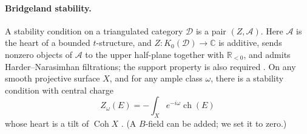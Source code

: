 \documentclass[11pt]{article}
\theoremstyle{definition}
\theoremstyle{remark}
\begin{document}
\paragraph{Bridgeland stability.} A stability condition on a triangulated category $\mathcal D$ is a
pair $(Z,\mathcal A)$. Here $\mathcal A$ is the heart of a bounded $t$-structure, and
$Z\colon K_0(\mathcal D)\to\mathbb{C}$ is additive, sends nonzero objects of $\mathcal A$ to the upper
half-plane together with $\mathbb{R}_{<0}$, and admits Harder--Narasimhan filtrations; the support
property is also required \cite{Bridgeland2007}. On any smooth projective surface $X$, and for
any ample class $\omega$, there is a stability condition with central charge
\[
Z_\omega(E)=-\int_Xe^{-i\omega}\operatorname{ch}(E)
\]
whose heart is a tilt of $\operatorname{Coh}X$ \cite{ArcaraBertram2013,MacriSchmidt2017}. (A $B$-field
can be added; we set it to zero.)
\end{document}
